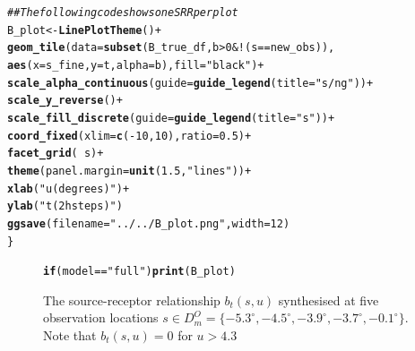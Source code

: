 \documentclass[a4paper,11pt]{article}\usepackage[]{graphicx}\usepackage[]{color}
\makeatletter
\newcommand{\hlnum}[1]{\textcolor[rgb]{0.686,0.059,0.569}{#1}}%
\newcommand{\hlstr}[1]{\textcolor[rgb]{0.192,0.494,0.8}{#1}}%
\newcommand{\hlcom}[1]{\textcolor[rgb]{0.678,0.584,0.686}{\textit{#1}}}%
\newcommand{\hlopt}[1]{\textcolor[rgb]{0,0,0}{#1}}%
\newcommand{\hlstd}[1]{\textcolor[rgb]{0.345,0.345,0.345}{#1}}%
\newcommand{\hlkwa}[1]{\textcolor[rgb]{0.161,0.373,0.58}{\textbf{#1}}}%
\newcommand{\hlkwb}[1]{\textcolor[rgb]{0.69,0.353,0.396}{#1}}%
\newcommand{\hlkwc}[1]{\textcolor[rgb]{0.333,0.667,0.333}{#1}}%
\newcommand{\hlkwd}[1]{\textcolor[rgb]{0.737,0.353,0.396}{\textbf{#1}}}%
\newenvironment{kframe}{%
 \def\at@end@of@kframe{}%
 \ifinner\ifhmode%
  \def\at@end@of@kframe{\end{minipage}}%
  \begin{minipage}{\columnwidth}%
 \fi\fi%
 \def\FrameCommand##1{\hskip\@totalleftmargin \hskip-\fboxsep
 \colorbox{shadecolor}{##1}\hskip-\fboxsep
     \hskip-\linewidth \hskip-\@totalleftmargin \hskip\columnwidth}%
 \MakeFramed {\advance\hsize-\width
   \@totalleftmargin\z@ \linewidth\hsize
   \@setminipage}}%
 {\par\unskip\endMakeFramed%
 \at@end@of@kframe}
\newenvironment{knitrout}{}{} %
\makeatother
\begin{document}
\begin{knitrout}
\begin{kframe}
\begin{alltt}
  \hlcom{## The following code shows one SRR per plot  }
  \hlstd{B_plot} \hlkwb{<-} \hlkwd{LinePlotTheme}\hlstd{()} \hlopt{+}
    \hlkwd{geom_tile}\hlstd{(}\hlkwc{data}\hlstd{=}\hlkwd{subset}\hlstd{(B_true_df,b}\hlopt{>}\hlnum{0} \hlopt{& !}\hlstd{(s}\hlopt{==}\hlstd{new_obs)),}
              \hlkwd{aes}\hlstd{(}\hlkwc{x}\hlstd{=s_fine,}\hlkwc{y}\hlstd{=t,}\hlkwc{alpha}\hlstd{=b),}\hlkwc{fill}\hlstd{=}\hlstr{"black"}\hlstd{)} \hlopt{+}
    \hlkwd{scale_alpha_continuous}\hlstd{(}\hlkwc{guide}\hlstd{=}\hlkwd{guide_legend}\hlstd{(}\hlkwc{title}\hlstd{=}\hlstr{"s/ng"}\hlstd{))} \hlopt{+}
    \hlkwd{scale_y_reverse}\hlstd{()}\hlopt{+}
    \hlkwd{scale_fill_discrete}\hlstd{(}\hlkwc{guide}\hlstd{=}\hlkwd{guide_legend}\hlstd{(}\hlkwc{title}\hlstd{=}\hlstr{"s"}\hlstd{))} \hlopt{+}
    \hlkwd{coord_fixed}\hlstd{(}\hlkwc{xlim}\hlstd{=}\hlkwd{c}\hlstd{(}\hlopt{-}\hlnum{10}\hlstd{,}\hlnum{10}\hlstd{),}\hlkwc{ratio} \hlstd{=} \hlnum{0.5}\hlstd{)}  \hlopt{+}
    \hlkwd{facet_grid}\hlstd{(}\hlopt{~}\hlstd{s)} \hlopt{+}
    \hlkwd{theme}\hlstd{(}\hlkwc{panel.margin} \hlstd{=} \hlkwd{unit}\hlstd{(}\hlnum{1.5}\hlstd{,} \hlstr{"lines"}\hlstd{))} \hlopt{+}
    \hlkwd{xlab}\hlstd{(}\hlstr{"u (degrees)"}\hlstd{)} \hlopt{+}
    \hlkwd{ylab}\hlstd{(}\hlstr{"t (2 h steps)"}\hlstd{)}
  \hlkwd{ggsave}\hlstd{(}\hlkwc{filename} \hlstd{=} \hlstr{"../../B_plot.png"}\hlstd{,}\hlkwc{width}\hlstd{=}\hlnum{12}\hlstd{)}
\hlstd{\}}
\end{alltt}
\end{kframe}
\end{knitrout}

\begin{figure}
\begin{center}
\begin{knitrout}
\color{fgcolor}\begin{kframe}
\begin{alltt}
\hlkwa{if}\hlstd{(model} \hlopt{==} \hlstr{"full"}\hlstd{)} \hlkwd{print}\hlstd{(B_plot)}
\end{alltt}
\end{kframe}
\end{knitrout}
\end{center}
\caption{ The source-receptor relationship $b_t(s,u)$ synthesised at five observation locations $s \in D^O_m = \{-5.3^\circ, -4.5^\circ,-3.9^\circ,-3.7^\circ,-0.1^\circ \}$. Note that $b_t(s,u) = 0$ for $u > 4.3$}
\label{fig:B}
\end{figure}
\end{document}
